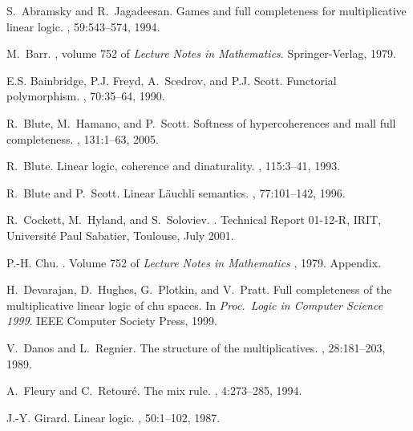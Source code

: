 \documentclass{LMCS}
\theoremstyle{plain}\newtheorem*{cLm}{Claim}
\begin{document}

\begin{thebibliography}{DHPP99}

S.~Abramsky and R.~Jagadeesan.
\newblock Games and full completeness for multiplicative linear logic.
, 59:543--574, 1994.

M.~Barr.
, volume 752 of {\em Lecture Notes
  in Mathematics}.
\newblock Springer-Verlag, 1979.

E.S. Bainbridge, P.J. Freyd, A.~Scedrov, and P.J. Scott.
\newblock Functorial polymorphism.
, 70:35--64, 1990.

R.~Blute, M.~Hamano, and P.~Scott.
\newblock Softness of hypercoherences and mall full completeness.
, 131:1--63, 2005.

R.~Blute.
\newblock Linear logic, coherence and dinaturality.
, 115:3--41, 1993.

R.~Blute and P.~Scott.
\newblock Linear {L}\"auchli semantics.
, 77:101--142, 1996.

R.~Cockett, M.~Hyland, and S.~Soloviev.
.
\newblock Technical Report 01-12-R, IRIT, Université Paul Sabatier, Toulouse,
  July 2001.

P.-H. Chu.
.
\newblock Volume 752 of {\em Lecture Notes in Mathematics\/} \cite{Bar79},
  1979.
\newblock Appendix.

H.~Devarajan, D.~Hughes, G.~Plotkin, and V.~Pratt.
\newblock Full completeness of the multiplicative linear logic of chu spaces.
\newblock In {\em {Proc.\ Logic in Computer Science 1999}}. IEEE Computer
  Society Press, 1999.

V.~Danos and L.~Regnier.
\newblock The structure of the multiplicatives.
, 28:181--203, 1989.

A.~Fleury and C.~Retour\'e.
\newblock The mix rule.
, 4:273--285, 1994.

J.-Y. Girard.
\newblock Linear logic.
, 50:1--102, 1987.


\end{thebibliography}
\end{document}

